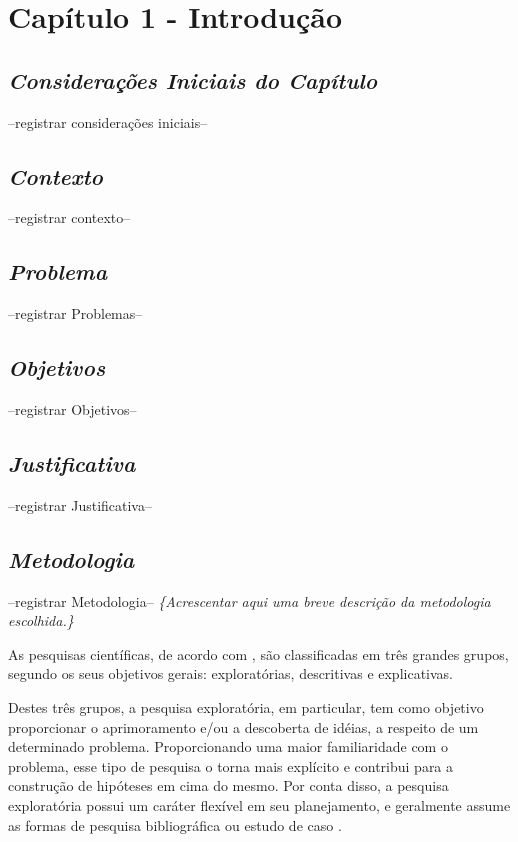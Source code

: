 \chapter[Capítulo 1 - Introdução]{Capítulo 1 - Introdução}

\section{\textit{Considerações Iniciais do Capítulo}}

--registrar considerações iniciais--

\section{\textit{Contexto}}

--registrar contexto--

\section{\textit{Problema}}

--registrar Problemas--

\section{\textit{Objetivos}}

--registrar Objetivos--

\section{\textit{Justificativa}}

--registrar Justificativa--

\section{\textit{Metodologia}}

--registrar Metodologia--
\textit{\{Acrescentar aqui uma breve descrição da metodologia escolhida.\}}

As pesquisas científicas, de acordo com , são classificadas em três grandes grupos, segundo os seus objetivos gerais: exploratórias, descritivas e explicativas.

Destes três grupos, a pesquisa exploratória, em particular, tem como objetivo proporcionar o aprimoramento e/ou a descoberta de idéias, a respeito de um determinado problema. Proporcionando uma maior familiaridade com o problema, esse tipo de pesquisa o torna mais explícito e contribui para a construção de hipóteses em cima do mesmo. Por conta disso, a pesquisa exploratória possui um caráter flexível em seu planejamento, e geralmente assume as formas de pesquisa bibliográfica ou estudo de caso \cite{gil2002}.

